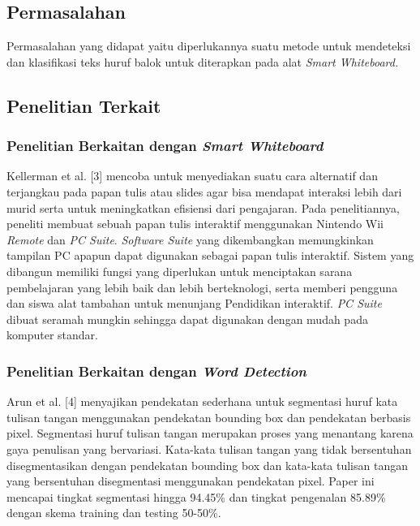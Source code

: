 \subsection{Permasalahan}

Permasalahan yang didapat yaitu diperlukannya suatu metode untuk mendeteksi dan klasifikasi teks huruf balok untuk diterapkan pada alat \textit{Smart Whiteboard.} 

\subsection{Penelitian Terkait}

\subsubsection{Penelitian Berkaitan dengan \textit{Smart Whiteboard}}
Kellerman et al. [3] mencoba untuk menyediakan suatu cara alternatif dan terjangkau pada papan tulis atau slides agar bisa mendapat interaksi lebih dari murid serta untuk meningkatkan efisiensi dari pengajaran. Pada penelitiannya, peneliti membuat sebuah papan tulis interaktif menggunakan Nintendo Wii \textit{Remote} dan \textit{PC Suite}. \textit{Software Suite} yang dikembangkan memungkinkan tampilan PC apapun dapat digunakan sebagai papan tulis interaktif. Sistem yang dibangun memiliki fungsi yang diperlukan untuk menciptakan sarana pembelajaran yang lebih baik dan lebih berteknologi, serta memberi pengguna dan siswa alat tambahan untuk menunjang Pendidikan interaktif. \textit{PC Suite} dibuat seramah mungkin sehingga dapat digunakan dengan mudah pada komputer standar.\

\subsubsection{Penelitian Berkaitan dengan \textit{Word Detection}}
Arun et al. [4] menyajikan pendekatan sederhana untuk segmentasi huruf kata tulisan tangan menggunakan pendekatan bounding box dan pendekatan berbasis pixel. Segmentasi huruf tulisan tangan merupakan proses yang menantang karena gaya penulisan yang bervariasi. Kata-kata tulisan tangan yang tidak bersentuhan disegmentasikan dengan pendekatan bounding box dan kata-kata tulisan tangan yang bersentuhan disegmentasi menggunakan pendekatan pixel. Paper ini mencapai tingkat segmentasi hingga 94.45\% dan tingkat pengenalan 85.89\% dengan skema training dan testing 50-50\%.

